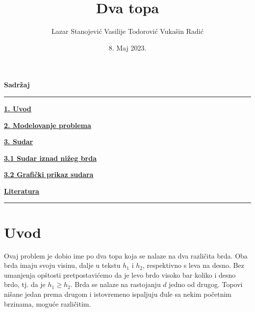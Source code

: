 \documentclass{article}
\begin{document}
\title{\fontsize{36}{22}\selectfont Dva topa}
\author{\fontsize{14}{18}\selectfont Lazar Stanojević Vasilije Todorović Vukašin Radić}
\date{8. Maj 2023.}
\maketitle    


\newpage

\begin{center}
\textbf{\huge Sadržaj}
\end{center}

\hrule

\bigskip

\textbf{\Large \hyperref[sec:uvod]{1. Uvod}} 

\medskip

\textbf{\Large \hyperref[sec:modelovanje]{2. Modelovanje problema}} 

\medskip

\textbf{\Large \hyperref[sec:sudar]{3. Sudar}} 

\medskip

\textbf{\hspace{0.5cm} \Large \hyperref[sec:sudarnize]{3.1 Sudar iznad nižeg brda}} 

\medskip

\textbf{\hspace{0.5cm} \Large \hyperref[sec:sudargraf]{3.2 Grafički prikaz sudara}} 

\medskip

\textbf{\Large \hyperref[sec:literatura]{Literatura}} 

\bigskip

\hrule

\bigskip

\newpage

\section{\huge Uvod}\label{sec:uvod}
\fontsize{14}{14}\selectfont
Ovaj problem je dobio ime po dva topa koja se nalaze na dva različita brda. Oba brda imaju svoju visinu, dalje u tekstu $h_1$ i $h_2$, respektivno s leva na desno. Bez umanjenja opštosti pretpostavićemo da je levo brdo visoko bar koliko i desno brdo, tj. da je $h_1 \geq h_2$.
\newline
Brda se nalaze na rastojanju $d$ jedno od drugog. Topovi nišane jedan prema drugom i istovremeno ispaljuju đule sa nekim početnim brzinama, moguće različitim. 
\newline
\end{document}
